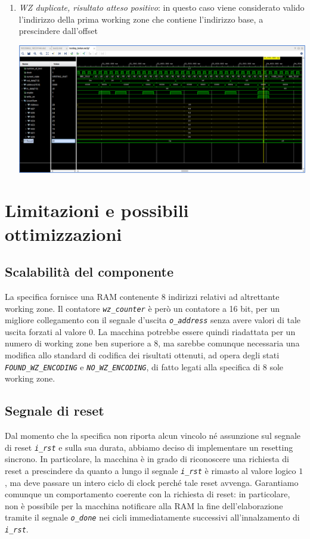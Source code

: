\documentclass[12pt,a4paper,titlepage]{article}
\begin{document}
\begin{enumerate}
	\item \textit{WZ duplicate, risultato atteso positivo}: in questo caso viene considerato valido l'indirizzo della prima working zone che contiene l'indirizzo base, a prescindere dall'offset
	
		\begin{center}
			\includegraphics[scale=0.4]{test13.png}
		\end{center}
		\vspace{0.5cm}
	
	\end{enumerate}
		
	\section{Limitazioni e possibili ottimizzazioni}
		\subsection{Scalabilità del componente}
			La specifica fornisce una RAM contenente 8 indirizzi relativi ad altrettante working zone. Il contatore \textit{\texttt{wz\_counter}} è però un contatore a 16 bit, per un migliore collegamento con il segnale d'uscita \textit{\texttt{o\_address}} senza avere valori di tale uscita forzati al valore $0$. La macchina potrebbe essere quindi riadattata per un numero di working zone ben superiore a 8, ma sarebbe comunque necessaria una modifica allo standard di codifica dei risultati ottenuti, ad opera degli stati \textit{\texttt{FOUND\_WZ\_ENCODING}} e \textit{\texttt{NO\_WZ\_ENCODING}}, di fatto legati alla specifica di 8 sole working zone.
		\subsection{Segnale di reset} \label{sec:reset}
			Dal momento che la specifica non riporta alcun vincolo né assunzione sul segnale di reset \textit{\texttt{i\_rst}} e sulla sua durata, abbiamo deciso di implementare un resetting sincrono. In particolare, la macchina è in grado di riconoscere una richiesta di reset a prescindere da quanto a lungo il segnale \textit{\texttt{i\_rst}} è rimasto al valore logico $1$, ma deve passare un intero ciclo di clock perché tale reset avvenga. Garantiamo comunque un comportamento coerente con la richiesta di reset: in particolare, non è possibile per la macchina notificare alla RAM la fine dell'elaborazione tramite il segnale \textit{\texttt{o\_done}} nei cicli immediatamente successivi all'innalzamento di \textit{\texttt{i\_rst}}.
\end{document}
